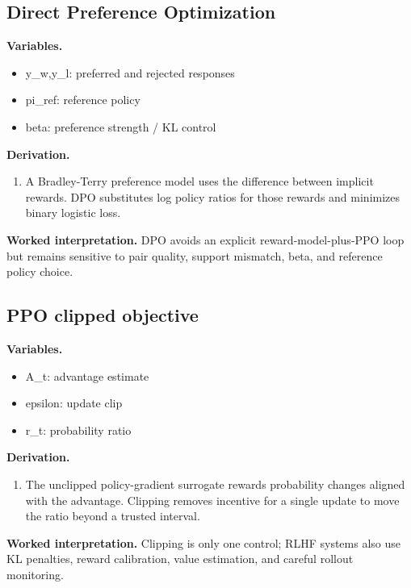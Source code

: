 \subsection{Direct Preference Optimization}
\textbf{Variables.}\begin{itemize}
\item y\_w,y\_l: preferred and rejected responses
\item pi\_ref: reference policy
\item beta: preference strength / KL control
\end{itemize}
\textbf{Derivation.}\begin{derivation}\begin{enumerate}
\item A Bradley-Terry preference model uses the difference between implicit rewards. DPO substitutes log policy ratios for those rewards and minimizes binary logistic loss.
\end{enumerate}\end{derivation}
\textbf{Worked interpretation.} DPO avoids an explicit reward-model-plus-PPO loop but remains sensitive to pair quality, support mismatch, beta, and reference policy choice.
\subsection{PPO clipped objective}
\textbf{Variables.}\begin{itemize}
\item A\_t: advantage estimate
\item epsilon: update clip
\item r\_t: probability ratio
\end{itemize}
\textbf{Derivation.}\begin{derivation}\begin{enumerate}
\item The unclipped policy-gradient surrogate rewards probability changes aligned with the advantage. Clipping removes incentive for a single update to move the ratio beyond a trusted interval.
\end{enumerate}\end{derivation}
\textbf{Worked interpretation.} Clipping is only one control; RLHF systems also use KL penalties, reward calibration, value estimation, and careful rollout monitoring.
